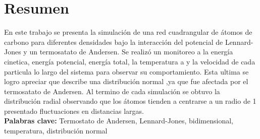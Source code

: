 \section{Resumen}
En este trabajo se presenta la simulación de una red cuadrangular de átomos de carbono para diferentes densidades bajo la interacción del potencial de 
Lennard-Jones y un termosatato de Andersen. Se realizó un monitoreo a la energía cinetica, energía potencial, energía total, la temperatura a 
y la velocidad de cada particula lo largo del sistema para observar su comportamiento. Esta ultima se logro apreciar que describe una distribución normal
,ya que fue afectada por el termosatato de Andersen. Al termino de cada simulación se obtuvo la distribución radial observando que los átomos
tienden a centrarse a un radio de 1 presentado fluctuaciones en distancias largas.\\
\textbf{Palabras clave:} Termostato de Andersen, Lennard-Jones, bidimensional, temperatura, distribución normal